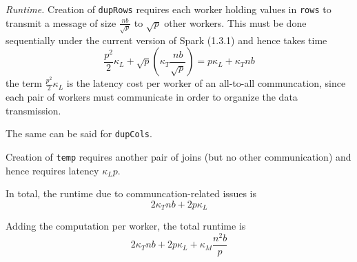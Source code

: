 \documentclass{article} %
\begin{document}
\emph{Runtime.}  Creation of {\tt dupRows} requires each worker
holding values in {\tt rows} to transmit a message of size
$\frac{nb}{\sqrt{p}}$ to $\sqrt{p}$ other workers.  This must be done
sequentially under the current version of Spark (1.3.1) and hence
takes time
\[
\frac{p^2}{2} \kappa_L  + \sqrt{p}\left(\kappa_T \frac{nb}{\sqrt{p}}\right) = p\kappa_L + \kappa_T nb
\]
the term $\frac{p^2}{2} \kappa_L$ is the latency cost per worker of an all-to-all communcation,
since each pair of workers must communicate in order to organize the data transmission.

The same can be said for {\tt dupCols}.

Creation of {\tt temp} requires another pair of joins (but no other communication)
and hence requires latency $\kappa_L p$.

In total, the runtime due to communcation-related issues is
\[
2\kappa_T nb + 2p\kappa_L
\]

Adding the computation per worker, the total runtime is
\[
2\kappa_T nb + 2p\kappa_L + \kappa_M \frac{n^2b}{p}
\]









\end{document}
